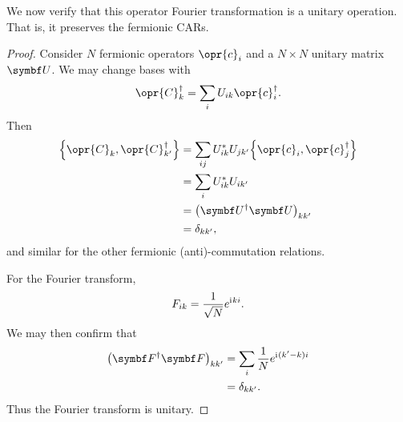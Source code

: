 \documentclass[../thesis.tex]{subfiles}
\begin{document}
We now verify that this operator Fourier transformation is a unitary operation.
That is, it preserves the fermionic CARs.
\begin{proof}
  Consider $N$ fermionic operators $\opr{c}_i$ and a $N \times N$ unitary matrix
  $\mq{U}$. We may change bases with
  \begin{equation}
    \opr{C}_k^\dag
    = \sum_i U_{ik} \opr{c}_i^\dag.
  \end{equation}
  Then
  \begin{align}
    \acomm{\opr{C}_k}{\opr{C}_{k'}^\dag}
    &= \sum_{ij} U_{ik}^*U_{jk'} \acomm{\opr{c}_i}{\opr{c}_j^\dag} \\
    &= \sum_i U_{ik}^*U_{ik'} \\
    &= {\qty(\mq{U}^\dag\mq{U})}_{kk'} \\
    &= \delta_{kk'},
  \end{align}
  and similar for the other fermionic (anti)-commutation relations.

  For the Fourier transform,
  \begin{equation}
    F_{ik}
    = \frac{1}{\sqrt{N}} e^{\mathrm{i}\mkern1mu ki}.
  \end{equation}
  We may then confirm that
  \begin{align}
    {\qty(\mq{F}^\dag\mq{F})}_{kk'}
    &= \sum_i \frac{1}{N} e^{\im (k' - k)i} \\
    &= \delta_{kk'}.
  \end{align}
  Thus the Fourier transform is unitary.
\end{proof}
\end{document}
